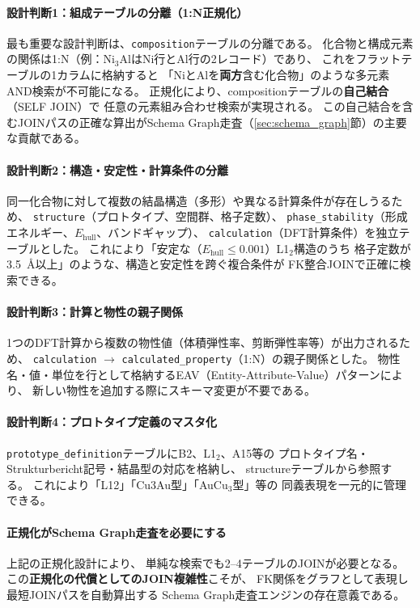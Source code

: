 \documentclass[5p,twocolumn]{elsarticle}
\begin{document}
\paragraph{設計判断1：組成テーブルの分離（1:N正規化）}
最も重要な設計判断は、\texttt{composition}テーブルの分離である。
化合物と構成元素の関係は1:N（例：Ni$_3$AlはNi行とAl行の2レコード）であり、
これをフラットテーブルの1カラムに格納すると
「NiとAlを\textbf{両方}含む化合物」のような多元素AND検索が不可能になる。
正規化により、compositionテーブルの\textbf{自己結合}（SELF JOIN）で
任意の元素組み合わせ検索が実現される。
この自己結合を含むJOINパスの正確な算出がSchema Graph走査（\ref{sec:schema_graph}節）の主要な貢献である。

\paragraph{設計判断2：構造・安定性・計算条件の分離}
同一化合物に対して複数の結晶構造（多形）や異なる計算条件が存在しうるため、
\texttt{structure}（プロトタイプ、空間群、格子定数）、
\texttt{phase\_stability}（形成エネルギー、$E_\text{hull}$、バンドギャップ）、
\texttt{calculation}（DFT計算条件）を独立テーブルとした。
これにより「安定な（$E_\text{hull} \leq 0.001$）L1$_2$構造のうち
格子定数が3.5~\AA{}以上」のような、構造と安定性を跨ぐ複合条件が
FK整合JOINで正確に検索できる。

\paragraph{設計判断3：計算と物性の親子関係}
1つのDFT計算から複数の物性値（体積弾性率、剪断弾性率等）が出力されるため、
\texttt{calculation} $\to$ \texttt{calculated\_property}（1:N）の親子関係とした。
物性名・値・単位を行として格納するEAV（Entity-Attribute-Value）パターンにより、
新しい物性を追加する際にスキーマ変更が不要である。

\paragraph{設計判断4：プロトタイプ定義のマスタ化}
\texttt{prototype\_definition}テーブルにB2、L1$_2$、A15等の
プロトタイプ名・Strukturbericht記号・結晶型の対応を格納し、
structureテーブルから参照する。
これにより「L12」「Cu3Au型」「AuCu$_3$型」等の
同義表現を一元的に管理できる。

\paragraph{正規化がSchema Graph走査を必要にする}
上記の正規化設計により、
単純な検索でも2--4テーブルのJOINが必要となる。
この\textbf{正規化の代償としてのJOIN複雑性}こそが、
FK関係をグラフとして表現し最短JOINパスを自動算出する
Schema Graph走査エンジンの存在意義である。
\end{document}
